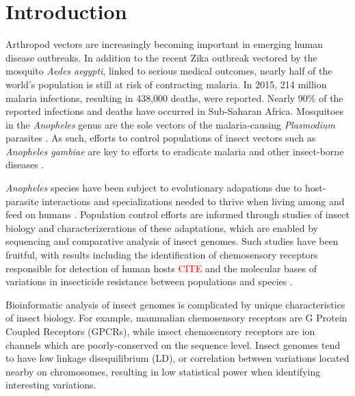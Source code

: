 \chapter{Introduction}

Arthropod vectors are increasingly becoming important in emerging human disease outbreaks.  In addition to the recent Zika outbreak vectored by the mosquito \emph{Aedes aegypti}, linked to serious medical outcomes, nearly half of the world's population is still at risk of contracting malaria.  In 2015, 214 million malaria infections, resulting in 438,000 deaths, were reported. Nearly 90\% of the reported infections and deaths have occurred in Sub-Saharan Africa.  Mosquitoes in the \emph{Anopheles} genus are the sole vectors of the malaria-causing \emph{Plasmodium} parasites \cite{Neafsey2015,Neafsey2010,Lawniczak2010}. As such, efforts to control populations of insect vectors such as \emph{Anopheles gambiae} are key to efforts to eradicate malaria and other insect-borne diseases \cite{Holt2002}.

\emph{Anopheles} species have been subject to evolutionary adapations due to host-parasite interactions and specializations needed to thrive when living among and feed on humans \cite{Neafsey2015}. Population control efforts are informed through studies of insect biology and characterizerations of these adaptations, which are enabled by sequencing and comparative analysis of insect genomes.   Such studies have been fruitful, with results including the identification of chemosensory receptors responsible for detection of human hosts \textcolor{red}{CITE} and the molecular bases of variations in insecticide resistance between populations and species \cite{Lawniczak2010}.

Bioinformatic analysis of insect genomes is complicated by unique characteristics of insect biology.  For example, mammalian chemosensory receptors are G Protein Coupled Receptors (GPCRs), while insect chemosensory receptors are ion channels which are poorly-conserved on the sequence level.  Insect genomes tend to have low linkage disequilibrium (LD), or correlation  between variations located nearby on chromosomes, resulting in low statistical power when identifying interesting variations.

